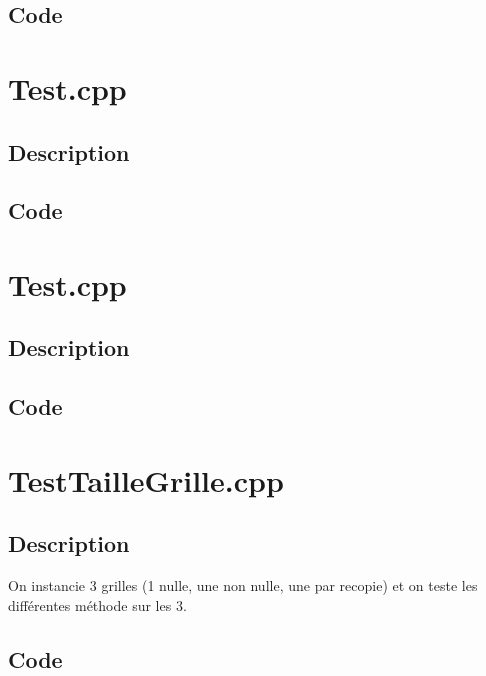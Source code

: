         \subsection{Code}
    \section{Test.cpp}
        \subsection{Description}
        \subsection{Code}
    \section{Test.cpp}
        \subsection{Description}
        \subsection{Code}
    \section{TestTailleGrille.cpp}
        \subsection{Description}
            On instancie 3 grilles (1 nulle, une non nulle, une par recopie) et on teste les différentes méthode sur les 3.
        \subsection{Code}
